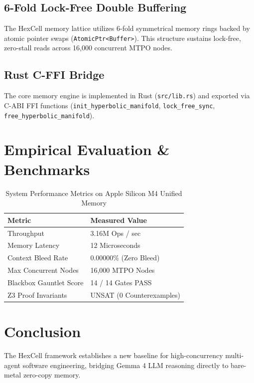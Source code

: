 \documentclass[10pt,twocolumn,letterpaper]{article}
\begin{document}
\subsection{6-Fold Lock-Free Double Buffering}
The HexCell memory lattice utilizes 6-fold symmetrical memory rings backed by atomic pointer swaps (\texttt{AtomicPtr<Buffer>}). This structure sustains lock-free, zero-stall reads across 16,000 concurrent MTPO nodes.

\subsection{Rust C-FFI Bridge}
The core memory engine is implemented in Rust (\texttt{src/lib.rs}) and exported via C-ABI FFI functions (\texttt{init\_hyperbolic\_manifold}, \texttt{lock\_free\_sync}, \texttt{free\_hyperbolic\_manifold}).

\section{Empirical Evaluation \& Benchmarks}

\begin{table}[h]
\centering
\caption{System Performance Metrics on Apple Silicon M4 Unified Memory}
\begin{tabular}{ll}
\toprule
\textbf{Metric} & \textbf{Measured Value} \\
\midrule
Throughput & 3.16M Ops / sec \\
Memory Latency & 12 Microseconds \\
Context Bleed Rate & 0.00000\% (Zero Bleed) \\
Max Concurrent Nodes & 16,000 MTPO Nodes \\
Blackbox Gauntlet Score & 14 / 14 Gates PASS \\
Z3 Proof Invariants & UNSAT (0 Counterexamples) \\
\bottomrule
\end{tabular}
\end{table}

\section{Conclusion}
The HexCell framework establishes a new baseline for high-concurrency multi-agent software engineering, bridging Gemma 4 LLM reasoning directly to bare-metal zero-copy memory.
\end{document}
